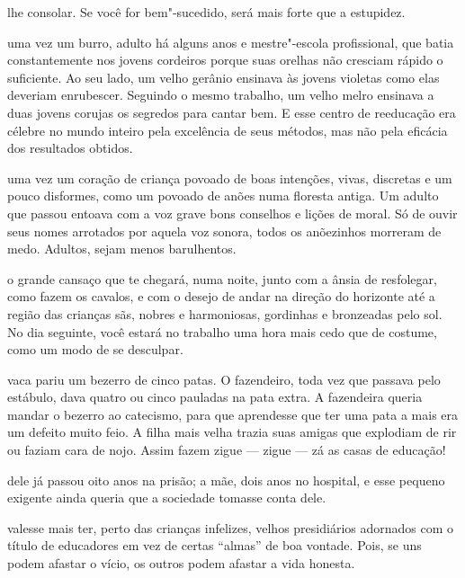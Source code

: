 \pagebreak
\thispagestyle{empty}

\movetooddpage


 lhe consolar. Se você for bem"-sucedido, será mais forte que a
estupidez.



 uma vez um burro, adulto há alguns anos e mestre"-escola
profissional, que batia constantemente nos jovens cordeiros porque suas
orelhas não cresciam rápido o suficiente. Ao seu lado, um velho gerânio
ensinava às jovens violetas como elas deveriam enrubescer. Seguindo o
mesmo trabalho, um velho melro ensinava a duas jovens corujas os
segredos para cantar bem. E esse centro de reeducação era célebre no
mundo inteiro pela excelência de seus métodos, mas não pela eficácia dos
resultados obtidos.



 uma vez um coração de criança povoado de boas intenções, vivas,
discretas e um pouco disformes, como um povoado de anões numa floresta
antiga. Um adulto que passou entoava com a voz grave bons conselhos e
lições de moral. Só de ouvir seus nomes arrotados por aquela voz
sonora, todos os anõezinhos morreram de medo. Adultos, sejam menos
barulhentos.


\pagebreak

 o grande cansaço que te chegará, numa noite, junto com a ânsia de
resfolegar, como fazem os cavalos, e com o desejo de andar na direção do
horizonte até a região das crianças sãs, nobres e harmoniosas, gordinhas
e bronzeadas pelo sol. No dia seguinte, você estará no trabalho uma hora
mais cedo que de costume, como um modo de se desculpar.



 vaca pariu um bezerro de cinco patas. O fazendeiro, toda vez que
passava pelo estábulo, dava quatro ou cinco pauladas na pata extra. A
fazendeira queria mandar o bezerro ao catecismo, para que aprendesse que
ter uma pata a mais era um defeito muito feio. A filha mais velha trazia
suas amigas que explodiam de rir ou faziam cara de nojo. Assim fazem
zigue --- zigue --- zá as casas de educação!



 dele já passou oito anos na prisão; a mãe, dois anos no hospital,
e esse pequeno exigente ainda queria que a sociedade tomasse conta dele.

\pagebreak

 valesse mais ter, perto das crianças infelizes, velhos
presidiários adornados com o título de educadores em vez de certas
``almas'' de boa vontade. Pois, se uns podem afastar o vício, os outros
podem afastar a vida honesta.



